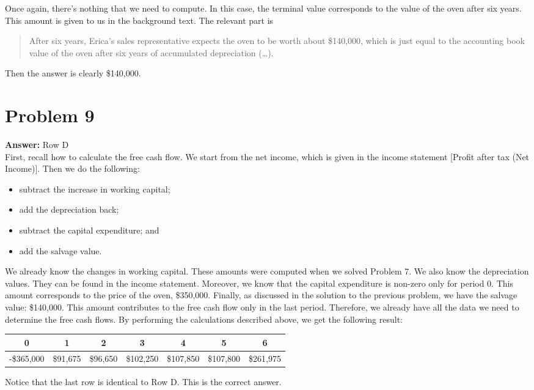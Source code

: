 \documentclass[11pt]{article}
\begin{document}
Once again, there's nothing that we need to compute. In this case, the terminal
value corresponds to the value of the oven after six years. This amount is given
to us in the background text. The relevant part is
\begin{quote}
After six years, Erica's sales representative expects the oven to be worth about
\$140,000, which is just equal to the accounting book value of the oven after six
years of accumulated depreciation (\ldots{}).
\end{quote}
Then the answer is clearly \$140,000.
\section*{Problem 9}
\label{sec:org104c114}

\textbf{Answer:} Row D\\

First, recall how to calculate the free cash flow. We start from the net income,
which is given in the income statement [Profit after tax (Net Income)]. Then we
do the following:
\begin{itemize}
\item subtract the increase in working capital;
\item add the depreciation back;
\item subtract the capital expenditure; and
\item add the salvage value.
\end{itemize}
We already know the changes in working capital. These amounts were computed when
we solved Problem 7. We also know the depreciation values. They can be found in
the income statement. Moreover, we know that the capital expenditure is non-zero
only for period 0. This amount corresponds to the price of the oven, \$350,000.
Finally, as discussed in the solution to the previous problem, we have the
salvage value: \$140,000. This amount contributes to the free cash flow only in
the last period. Therefore, we already have all the data we need to determine
the free cash flows. By performing the calculations described above, we get the
following result:
\begin{center}
\begin{tabular}{|c|c|c|c|c|c|c|}
\hline
0 & 1 & 2 & 3 & 4 & 5 & 6\\
\hline
-\$365,000 & \$91,675 & \$96,650 & \$102,250 & \$107,850 & \$107,800 & \$261,975\\
\hline
\end{tabular}
\end{center}
Notice that the last row is identical to Row D. This is the correct answer.
\end{document}
